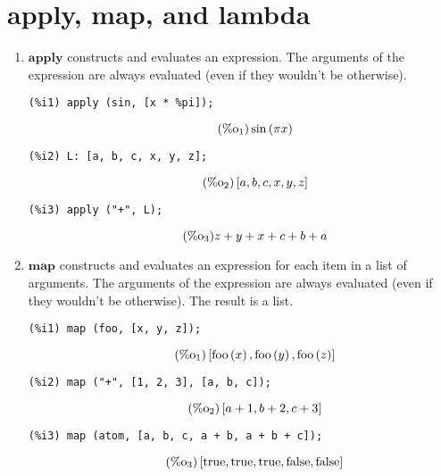 \documentclass[12pt,leqno]{article}
\begin{document}
\section{apply, map, and lambda}

\begin{enumerate}

\item $\mathbf{apply}$ constructs and evaluates an expression.
The arguments of the expression are always evaluated (even if they wouldn't be otherwise).
\begin{verbatim}
(%i1) apply (sin, [x * %pi]);
\end{verbatim}
\begin{equation}
\tag{$\mathop{\mathrm{\%o}}_{1}$}\sin \left(\pi x\right)
\label{eq:doc-group1-code23-1-1}
\end{equation}
\begin{verbatim}
(%i2) L: [a, b, c, x, y, z];
\end{verbatim}
\begin{equation}
\tag{$\mathop{\mathrm{\%o}}_{2}$}\left[a, b, c, x, y, z\right]
\label{eq:doc-group1-code23-2-1}
\end{equation}
\begin{verbatim}
(%i3) apply ("+", L);
\end{verbatim}
\begin{equation}
\tag{$\mathop{\mathrm{\%o}}_{3}$}z+y+x+c+b+a
\label{eq:doc-group1-code23-3-1}
\end{equation}


\item $\mathbf{map}$ constructs and evaluates an expression for each item in a list of arguments.
The arguments of the expression are always evaluated (even if they wouldn't be otherwise).
The result is a list.
\begin{verbatim}
(%i1) map (foo, [x, y, z]);
\end{verbatim}
\begin{equation}
\tag{$\mathop{\mathrm{\%o}}_{1}$}\left[\mathop{\mathrm{foo}}\left(x\right), \mathop{\mathrm{foo}}\left(y\right), \mathop{\mathrm{foo}}\left(z\right)\right]
\label{eq:doc-group1-code24-1-1}
\end{equation}
\begin{verbatim}
(%i2) map ("+", [1, 2, 3], [a, b, c]);
\end{verbatim}
\begin{equation}
\tag{$\mathop{\mathrm{\%o}}_{2}$}\left[a+1, b+2, c+3\right]
\label{eq:doc-group1-code24-2-1}
\end{equation}
\begin{verbatim}
(%i3) map (atom, [a, b, c, a + b, a + b + c]);
\end{verbatim}
\begin{equation}
\tag{$\mathop{\mathrm{\%o}}_{3}$}\left[\mathop{\mathrm{true}}, \mathop{\mathrm{true}}, \mathop{\mathrm{true}}, \mathop{\mathrm{false}}, \mathop{\mathrm{false}}\right]
\label{eq:doc-group1-code24-3-1}
\end{equation}



\end{enumerate}
\end{document}
